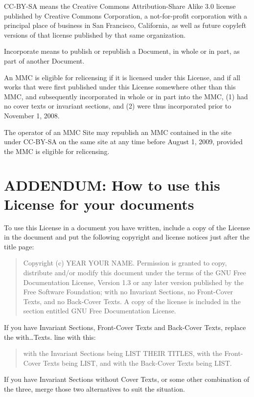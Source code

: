 \documentclass[captions=tableheading]{scrbook}
\begin{document}
\begin{example}
CC-BY-SA means the Creative Commons Attribution-Share Alike 3.0 license published by Creative Commons Corporation, a not-for-profit corporation with a principal place of business in San Francisco, California, as well as future copyleft versions of that license published by that same organization.

Incorporate means to publish or republish a Document, in whole or in part, as part of another Document.

An MMC is eligible for relicensing if it is licensed under this License, and if all works that were first published under this License somewhere other than this MMC, and subsequently incorporated in whole or in part into the MMC, (1) had no cover texts or invariant sections, and (2) were thus incorporated prior to November 1, 2008.

The operator of an MMC Site may republish an MMC contained in the site under CC-BY-SA on the same site at any time before August 1, 2009, provided the MMC is eligible for relicensing.
\section{ADDENDUM: How to use this License for your documents}
\label{sec-18-13}


To use this License in a document you have written, include a copy of the License in the document and put the following copyright and license notices just after the title page: 

\begin{quote}
Copyright (c) YEAR YOUR NAME. Permission is granted to copy, distribute and/or modify this document under the terms of the GNU Free Documentation License, Version 1.3 or any later version published by the Free Software Foundation; with no Invariant Sections, no Front-Cover Texts, and no Back-Cover Texts. A copy of the license is included in the section entitled GNU Free Documentation License.
\end{quote}

If you have Invariant Sections, Front-Cover Texts and Back-Cover Texts, replace the with\ldots{}Texts. line with this:

\begin{quote}
with the Invariant Sections being LIST THEIR TITLES, with the Front-Cover Texts being LIST, and with the Back-Cover Texts being LIST.
\end{quote}

If you have Invariant Sections without Cover Texts, or some other combination of the three, merge those two alternatives to suit the situation.


\end{example}
\end{document}
